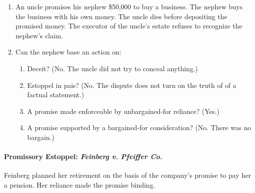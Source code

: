 \begin{enumerate}
    \item An uncle promises his nephew \$50,000 to buy a business. The nephew 
    buys the business with his own money. The uncle dies before depositing the 
    promised money. The executor of the uncle's estate refuses to recognize 
    the nephew's claim.
    \item Can the nephew base an action on:
    \begin{enumerate}
        \item Deceit? (No. The uncle did not try to conceal anything.)
        \item Estoppel in pais? (No. The dispute does not turn on the truth of
        of a factual statement.)
        \item A promise made enforceable by unbargained-for reliance? (Yes.)
        \item A promise supported by a bargained-for consideration? (No. There 
        was no bargain.)
    \end{enumerate}
\end{enumerate}

\paragraph{Promissory Estoppel: \emph{Feinberg v. Pfeiffer Co.}}

Feinberg planned her retirement on the basis of the company's promise to pay 
her a pension. Her reliance made the promise binding.

